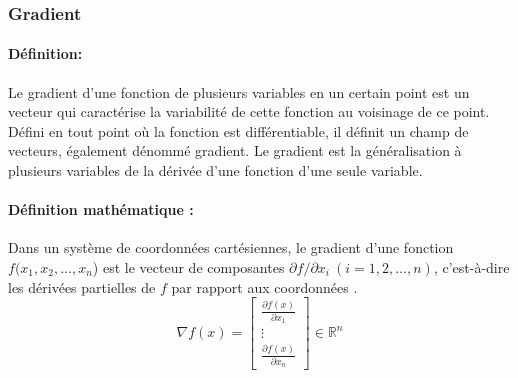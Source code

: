 			
			
		
	
	\subsubsection{\textbf{Gradient}}\label{sec:gradient}
		\paragraph*{Définition:}Le gradient d'une fonction de plusieurs variables en un certain point est un vecteur qui caractérise la variabilité de cette fonction au voisinage de ce point. Défini en tout point où la fonction est différentiable, il définit un champ de vecteurs, également dénommé gradient. Le gradient est la généralisation à plusieurs variables de la dérivée d'une fonction d'une seule variable.%
		\paragraph*{Définition mathématique :} Dans un système de coordonnées cartésiennes, le gradient d'une fonction {$ f(x_{1},x_{2},\dots ,x_{n}$)} est le vecteur de composantes {$ \partial f/ \partial x_{i}\ (i=1,2,\dots ,n)$}, c'est-à-dire les dérivées partielles de $f$ par rapport aux coordonnées \cite{jtshiman:2021}.
		$${\nabla f(x)={
				\begin{bmatrix}
					{\frac {\partial f(x)}{\partial x_{1}}}\\
					\vdots \\
					{\frac {\partial f(x)}{\partial x_{n}}}
				\end{bmatrix}}} \in \mathbb{R}^n $$

